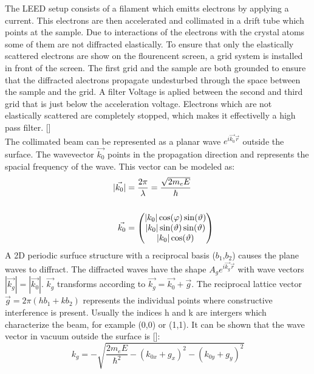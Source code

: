 \noindent The LEED setup consists of a filament which emitts electrons by applying a current.
This electrons are then accelerated and collimated in a drift tube which points at the sample.
Due to interactions of the electrons with the crystal atoms some of them are not diffracted elastically.
To ensure that only the elastically scattered electrons are show on the flourencent screen, a grid system is installed in front of the screen.
The first grid and the sample are both grounded to ensure that the diffracted alectrons propagate undesturbed through the space between the sample and the grid.
A filter Voltage is aplied between the second and third grid that is just below the acceleration voltage.
Electrons which are not elastically scattered are completely stopped, which makes it effectivelly a high pass filter. [\cite{MoritzWolfgang2022SSDb}] \\

\noindent The collimated beam can be represented as a planar wave $e^{i \vec{k_0} \vec{r}}$  outside the surface.
The wavevector $\vec{k_0}$ points in the propagation direction and represents the spacial frequency of the wave.
This vector can be modeled as:
\begin{align}
    |\vec{k_0}| &= \frac{2 \pi}{\lambda} = \frac{\sqrt{2 m_e E}}{\hbar} \\
    \hspace{1cm} \notag \\
    \vec{k_0} &= \begin{pmatrix}
        |k_0|\cos(\varphi)\sin(\vartheta)\\|k_0|\sin(\vartheta)\sin(\vartheta)\\|k_0| \cos(\vartheta)
    \end{pmatrix}
\end{align}
A 2D periodic surfuce structure with a reciprocal basis ($b_1$,$b_2$) causes the plane waves to diffract.
The diffracted waves have the shape $A_g e^{i \vec{k_g} \vec{r}}$ with wave vectors $|\vec{k_g}| = |\vec{k_0}|$.
$\vec{k_g}$ transforms according to $\vec{k_g} = \vec{k_0} + \vec{g}$. 
The reciprocal lattice vector $\vec{g} = 2 \pi ( h b_1 + k b_2)$ represents the individual points where constructive interference is present.
Usually the indices h and k are intergers which characterize the beam, for example (0,0) or (1,1).
It can be shown that the wave vector in vacuum outside the surface is [\cite{MoritzWolfgang2022SSDb}]:
\begin{equation}
    k_g = - \sqrt{\frac{2 m_e E}{\hbar^2} - (k_{0x}+ g_{x})^2 - (k_{0y}+ g_{y})^2}
\end{equation}

